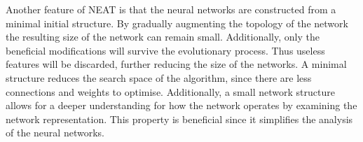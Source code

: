 Another feature of NEAT is that the neural networks are constructed from a minimal initial structure. By gradually augmenting the topology of the network the resulting size of the network can remain small. Additionally, only the beneficial modifications will survive the evolutionary process. Thus useless features will be discarded, further reducing the size of the networks. A minimal structure reduces the search space of the algorithm, since there are less connections and weights to optimise. Additionally, a small network structure allows for a deeper understanding for how the network operates by examining the network representation. This property is beneficial since it simplifies the analysis of the neural networks.

